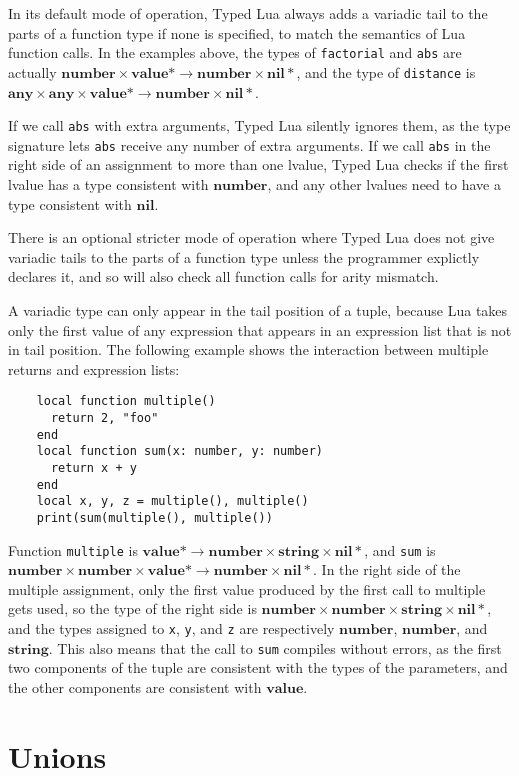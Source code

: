 \documentclass{sig-alternate}
\newcommand{\Any}{\mathbf{any}}
\newcommand{\Top}{\mathbf{value}}
\newcommand{\Nil}{\mathbf{nil}}
\newcommand{\Number}{\mathbf{number}}
\newcommand{\String}{\mathbf{string}}
\begin{document}
In its default mode of operation, Typed Lua always adds a
variadic tail to the parts of a function type if none is 
specified, to match the semantics of Lua function calls. In the 
examples above, the types
of {\tt factorial} and {\tt abs} are actually
$\Number \times \Top * \rightarrow \Number \times \Nil *$,
and the type of {\tt distance} is $\Any \times \Any \times \Top * 
\rightarrow \Number \times \Nil *$.

If we call {\tt abs} with extra arguments, Typed Lua silently
ignores them, as the type signature lets {\tt abs} receive any 
number of extra arguments. If we call {\tt abs} in the right side 
of an assignment to more than one lvalue, Typed Lua checks if the 
first lvalue has a type consistent with $\Number$, and any other 
lvalues need to have a type consistent with $\Nil$.

There is an optional stricter mode of operation where
Typed Lua does not give variadic tails to the parts
of a function type unless the programmer explictly
declares it, and so will also check all function calls
for arity mismatch. 

A variadic type can only appear in the tail position of a tuple,
because Lua takes only the first value of any expression that 
appears
in an expression list that is not in tail position. The following 
example
shows the interaction between multiple returns and expression 
lists:

\begin{verbatim}
    local function multiple()
      return 2, "foo"
    end
    local function sum(x: number, y: number)
      return x + y
    end
    local x, y, z = multiple(), multiple()
    print(sum(multiple(), multiple())
\end{verbatim}

Function {\tt multiple} is
$\Top * \rightarrow \Number \times \String \times \Nil *$,
and {\tt sum} is $\Number \times \Number \times \Top * \rightarrow
\Number \times \Nil *$. In the right side of the multiple assignment,
only the first value produced by the first call to multiple gets used, so
the type of the right side is $\Number \times \Number \times \String \times \Nil*$,
and the types assigned to {\tt x}, {\tt y}, and {\tt z} are respectively $\Number$,
$\Number$, and $\String$. This also means that the call to {\tt sum} compiles
without errors, as the first two components of the tuple are consistent with
the types of the parameters, and the other components are consistent with
$\Top$.

\section{Unions}
\label{sec:unions}
\end{document}
